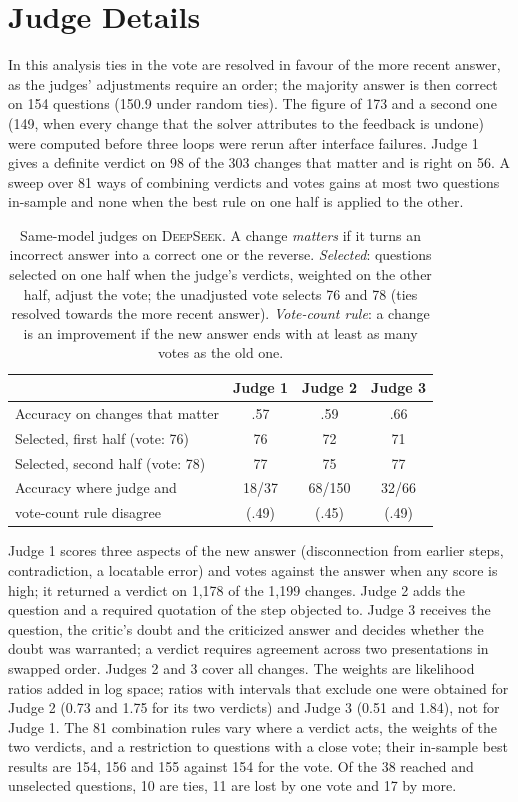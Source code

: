 \documentclass[11pt]{article}
\newcommand{\ds}{\textsc{DeepSeek}}
\begin{document}
\section{Judge Details}
\label{app:judges}

In this analysis ties in the vote are resolved in favour of the more recent answer, as the judges' adjustments require an order; the majority answer is then correct on 154 questions (150.9 under random ties).
The figure of 173 and a second one (149, when every change that the solver attributes to the feedback is undone) were computed before three loops were rerun after interface failures.
Judge 1 gives a definite verdict on 98 of the 303 changes that matter and is right on 56.
A sweep over 81 ways of combining verdicts and votes gains at most two questions in-sample and none when the best rule on one half is applied to the other.

\begin{table}[h]
\centering
\small
\setlength{\tabcolsep}{3.5pt}
\begin{tabular}{@{}l ccc@{}}
\toprule
 & Judge 1 & Judge 2 & Judge 3 \\
\midrule
Accuracy on changes that matter & .57 & .59 & .66 \\
Selected, first half (vote: 76) & 76 & 72 & 71 \\
Selected, second half (vote: 78) & 77 & 75 & 77 \\
Accuracy where judge and & 18/37 & 68/150 & 32/66 \\
\quad vote-count rule disagree & (.49) & (.45) & (.49) \\
\bottomrule
\end{tabular}
\caption{Same-model judges on \ds. A change \emph{matters} if it turns an incorrect answer into a correct one or the reverse. \emph{Selected}: questions selected on one half when the judge's verdicts, weighted on the other half, adjust the vote; the unadjusted vote selects 76 and 78 (ties resolved towards the more recent answer). \emph{Vote-count rule}: a change is an improvement if the new answer ends with at least as many votes as the old one.}
\label{tab:judges}
\end{table}


Judge 1 scores three aspects of the new answer (disconnection from earlier steps, contradiction, a locatable error) and votes against the answer when any score is high; it returned a verdict on 1{,}178 of the 1{,}199 changes.
Judge 2 adds the question and a required quotation of the step objected to.
Judge 3 receives the question, the critic's doubt and the criticized answer and decides whether the doubt was warranted; a verdict requires agreement across two presentations in swapped order.
Judges 2 and 3 cover all changes.
The weights are likelihood ratios added in log space; ratios with intervals that exclude one were obtained for Judge 2 (0.73 and 1.75 for its two verdicts) and Judge 3 (0.51 and 1.84), not for Judge 1.
The 81 combination rules vary where a verdict acts, the weights of the two verdicts, and a restriction to questions with a close vote; their in-sample best results are 154, 156 and 155 against 154 for the vote.
Of the 38 reached and unselected questions, 10 are ties, 11 are lost by one vote and 17 by more.
\end{document}

